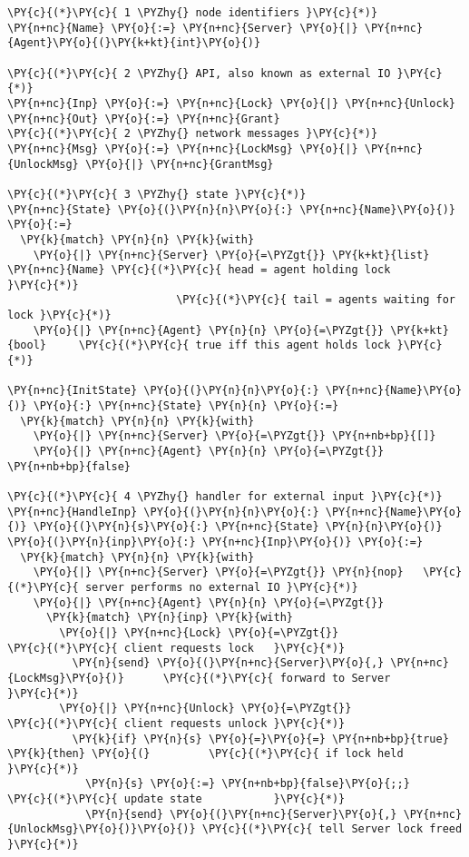 \begin{Verbatim}[commandchars=\\\{\},codes={\catcode`\$=3\catcode`\^=7\catcode`\_=8}]
\PY{c}{(*}\PY{c}{ 1 \PYZhy{} node identifiers }\PY{c}{*)}
\PY{n+nc}{Name} \PY{o}{:=} \PY{n+nc}{Server} \PY{o}{|} \PY{n+nc}{Agent}\PY{o}{(}\PY{k+kt}{int}\PY{o}{)}

\PY{c}{(*}\PY{c}{ 2 \PYZhy{} API, also known as external IO }\PY{c}{*)}
\PY{n+nc}{Inp} \PY{o}{:=} \PY{n+nc}{Lock} \PY{o}{|} \PY{n+nc}{Unlock}
\PY{n+nc}{Out} \PY{o}{:=} \PY{n+nc}{Grant}
\PY{c}{(*}\PY{c}{ 2 \PYZhy{} network messages }\PY{c}{*)}
\PY{n+nc}{Msg} \PY{o}{:=} \PY{n+nc}{LockMsg} \PY{o}{|} \PY{n+nc}{UnlockMsg} \PY{o}{|} \PY{n+nc}{GrantMsg}

\PY{c}{(*}\PY{c}{ 3 \PYZhy{} state }\PY{c}{*)}
\PY{n+nc}{State} \PY{o}{(}\PY{n}{n}\PY{o}{:} \PY{n+nc}{Name}\PY{o}{)} \PY{o}{:=}
  \PY{k}{match} \PY{n}{n} \PY{k}{with}
    \PY{o}{|} \PY{n+nc}{Server} \PY{o}{=\PYZgt{}} \PY{k+kt}{list} \PY{n+nc}{Name} \PY{c}{(*}\PY{c}{ head = agent holding lock      }\PY{c}{*)}
                          \PY{c}{(*}\PY{c}{ tail = agents waiting for lock }\PY{c}{*)}
    \PY{o}{|} \PY{n+nc}{Agent} \PY{n}{n} \PY{o}{=\PYZgt{}} \PY{k+kt}{bool}     \PY{c}{(*}\PY{c}{ true iff this agent holds lock }\PY{c}{*)}

\PY{n+nc}{InitState} \PY{o}{(}\PY{n}{n}\PY{o}{:} \PY{n+nc}{Name}\PY{o}{)} \PY{o}{:} \PY{n+nc}{State} \PY{n}{n} \PY{o}{:=}
  \PY{k}{match} \PY{n}{n} \PY{k}{with}
    \PY{o}{|} \PY{n+nc}{Server} \PY{o}{=\PYZgt{}} \PY{n+nb+bp}{[]}
    \PY{o}{|} \PY{n+nc}{Agent} \PY{n}{n} \PY{o}{=\PYZgt{}} \PY{n+nb+bp}{false}

\PY{c}{(*}\PY{c}{ 4 \PYZhy{} handler for external input }\PY{c}{*)}
\PY{n+nc}{HandleInp} \PY{o}{(}\PY{n}{n}\PY{o}{:} \PY{n+nc}{Name}\PY{o}{)} \PY{o}{(}\PY{n}{s}\PY{o}{:} \PY{n+nc}{State} \PY{n}{n}\PY{o}{)} \PY{o}{(}\PY{n}{inp}\PY{o}{:} \PY{n+nc}{Inp}\PY{o}{)} \PY{o}{:=}
  \PY{k}{match} \PY{n}{n} \PY{k}{with}
    \PY{o}{|} \PY{n+nc}{Server} \PY{o}{=\PYZgt{}} \PY{n}{nop}   \PY{c}{(*}\PY{c}{ server performs no external IO }\PY{c}{*)}
    \PY{o}{|} \PY{n+nc}{Agent} \PY{n}{n} \PY{o}{=\PYZgt{}}
      \PY{k}{match} \PY{n}{inp} \PY{k}{with}
        \PY{o}{|} \PY{n+nc}{Lock} \PY{o}{=\PYZgt{}}                     \PY{c}{(*}\PY{c}{ client requests lock   }\PY{c}{*)}
          \PY{n}{send} \PY{o}{(}\PY{n+nc}{Server}\PY{o}{,} \PY{n+nc}{LockMsg}\PY{o}{)}      \PY{c}{(*}\PY{c}{ forward to Server      }\PY{c}{*)}
        \PY{o}{|} \PY{n+nc}{Unlock} \PY{o}{=\PYZgt{}}                   \PY{c}{(*}\PY{c}{ client requests unlock }\PY{c}{*)}
          \PY{k}{if} \PY{n}{s} \PY{o}{=}\PY{o}{=} \PY{n+nb+bp}{true} \PY{k}{then} \PY{o}{(}         \PY{c}{(*}\PY{c}{ if lock held           }\PY{c}{*)}
            \PY{n}{s} \PY{o}{:=} \PY{n+nb+bp}{false}\PY{o}{;;}              \PY{c}{(*}\PY{c}{ update state           }\PY{c}{*)}
            \PY{n}{send} \PY{o}{(}\PY{n+nc}{Server}\PY{o}{,} \PY{n+nc}{UnlockMsg}\PY{o}{)}\PY{o}{)} \PY{c}{(*}\PY{c}{ tell Server lock freed }\PY{c}{*)}


\end{Verbatim}
